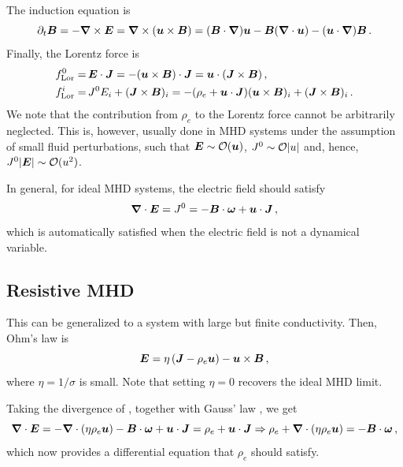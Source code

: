 \documentclass{article}
\begin{document}
The induction equation is
\begin{equation}
    \partial_t \BB = - \nab \times \EE = \nab \times (\uu \times \BB)
    = (\BB \cdot \nab) \uu - \BB (\nab \cdot \uu) - (\uu \cdot \nab) \BB\,.
\end{equation}
Finally, the Lorentz force is
\begin{align}
    f_{\rm Lor}^0 = &\, \EE \cdot \JJ = - (\uu \times \BB) \cdot \JJ = \uu \cdot 
    (\JJ \times \BB)\,, \\
    f_{\rm Lor}^i = &\, J^0 E_i + (\JJ \times \BB)_i = 
    - (\rho_e + \uu \cdot \JJ) (\uu \times \BB)_i  + (\JJ \times \BB)_i\,.
\end{align}
We note that the contribution from $\rho_e$ to the Lorentz force cannot be
arbitrarily neglected.
This is, however, usually done in MHD systems under the assumption of small
fluid perturbations, such that $\EE \sim {\cal O} (\uu)$, $J^0 \sim {\cal O} |u|$
and, hence, $J^0 |\EE| \sim {\cal O} (u^2)$.

In general, for ideal MHD systems, the electric field should satisfy
\begin{equation}
    \nab \cdot \EE = J^0 = - \BB \cdot \oom + \uu \cdot \JJ\,,
\end{equation}
which is automatically satisfied when the electric field is not a dynamical
variable.

\subsection{Resistive MHD}

This can be generalized to a system with large but finite conductivity.
Then, Ohm's law is \cite{RoperPol:2025lgc}
\begin{equation}
    \EE = \eta \, (\JJ - \rho_e \uu) - \uu \times \BB\,, \label{resis_Ohm}
\end{equation}
where $\eta = 1/\sigma$ is small.
Note that setting $\eta = 0$ recovers the ideal MHD limit.

Taking the divergence of , together with Gauss' law ,
we get
\begin{equation}
    \nab \cdot \EE = - \nab \cdot (\eta \rho_e \uu) - \BB \cdot \oom +
    \uu \cdot \JJ = \rho_e + \uu \cdot \JJ 
    \Rightarrow \rho_e + \nab \cdot (\eta \rho_e \uu) = - \BB \cdot \oom\,,
\end{equation}
which now provides a differential equation that $\rho_e$ should satisfy.
\end{document}
